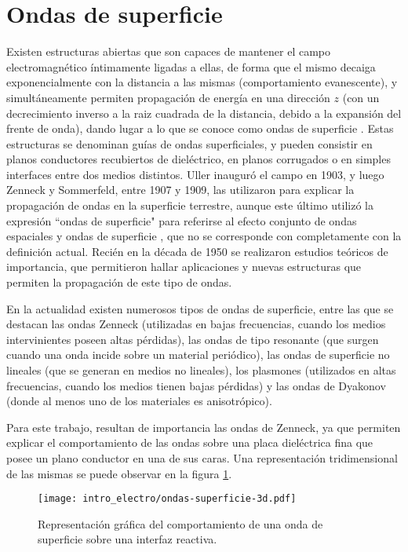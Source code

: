 \section{Ondas de superficie}

Existen estructuras abiertas que son capaces de mantener el campo electromagnético íntimamente ligadas a ellas, de forma que el mismo decaiga exponencialmente con la distancia a las mismas (comportamiento evanescente), y simultáneamente permiten propagación de energía en una dirección $z$ (con un decrecimiento inverso a la raiz cuadrada de la distancia, debido a la expansión del frente de onda), dando lugar a lo que se conoce como ondas de superficie \cite{Barlow:SurfaceWaves}. Estas estructuras se denominan guías de ondas superficiales, y pueden consistir en planos conductores recubiertos de dieléctrico, en planos corrugados o en simples interfaces entre dos medios distintos. Uller inauguró el campo en 1903, y luego Zenneck y Sommerfeld, entre 1907 y 1909, las utilizaron para explicar la propagación de ondas en la superficie terrestre, aunque este último utilizó la expresión ``ondas de superficie" para referirse al efecto conjunto de ondas espaciales y ondas de superficie \cite{Barlow:SurfaceWaves}, que no se corresponde con completamente con la definición actual. Recién en la década de 1950 se realizaron estudios teóricos de importancia, que permitieron hallar aplicaciones y nuevas estructuras que permiten la propagación de este tipo de ondas.

En la actualidad existen numerosos tipos de ondas de superficie, entre las que se destacan las ondas Zenneck (utilizadas en bajas frecuencias, cuando los medios intervinientes poseen altas pérdidas), las ondas de tipo resonante (que surgen cuando una onda incide sobre un material periódico), las ondas de superficie no lineales (que se generan en medios no lineales), los plasmones (utilizados en altas frecuencias, cuando los medios tienen bajas pérdidas) y las ondas de Dyakonov (donde al menos uno de los materiales es anisotrópico).

Para este trabajo, resultan de importancia las ondas de Zenneck, ya que permiten explicar el comportamiento de las ondas sobre una placa dieléctrica fina que posee un plano conductor en una de sus caras. Una representación tridimensional de las mismas se puede observar en la figura \ref{fig:onda-superficie-3d}.

\begin{figure}[htp]
	\centering
	\texttt{[image: intro\_electro/ondas-superficie-3d.pdf]}
	\caption{Representación gráfica del comportamiento de una onda de superficie sobre una interfaz reactiva.}
	\label{fig:onda-superficie-3d}
\end{figure}

